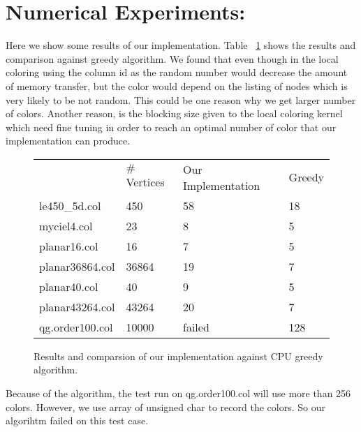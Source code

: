 \documentclass[12pt] {article}
\begin{document}

\section*{Numerical Experiments:}
Here we show some results of our implementation. Table ~\ref{tab:results} shows the results and comparison against greedy algorithm. We found that even though in the local coloring using the column id as the random number would decrease the amount of memory transfer, but the color would depend on the listing of nodes which is very likely to be not random. This could be one reason why we get larger number of colors. Another reason, is the blocking size given to the local coloring kernel which need fine tuning in order to reach an optimal number of color that our implementation can produce. 


\begin{figure}[tbh]
 \centering    
\begin{tabular}{ |p{4cm}||p{3cm}|| p{4cm}|p{4cm}|}
 \hline
   & $\#$Vertices & Our Implementation &  Greedy \\ 
     
     \hhline{|=||=||=|=|}
 \hline
 le450\_5d.col &450       & 58  &18 \\
 \hline
 myciel4.col &  23       & 8  &5 \\
 \hline
  planar16.col &16        & 7  &5 \\
 \hline
  planar36864.col & 36864     & 19  &7 \\
 \hline
   planar40.col &  40      & 9  & 5\\
 \hline
   planar43264.col & 43264     &  20 & 7\\
 \hline
   qg.order100.col & 10000     & failed &128 \\
 \hline
 
\end{tabular} 
\caption{Results and comparsion of our implementation against CPU greedy algorithm.}
   \label{tab:results}
\end{figure} 

Because of the algorithm, the test run on qg.order100.col will use more than 256 colors. However, we use array of unsigned char to record the colors. So our algorihtm failed on this test case.
\end{document}
